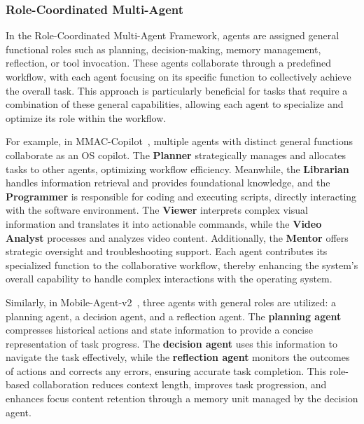 \subsubsection{Role-Coordinated Multi-Agent}
\label{subsubsec: Role-Coordinated Multi-Agent}

In the Role-Coordinated Multi-Agent Framework, agents are assigned general functional roles such as planning, decision-making, memory management, reflection, or tool invocation. These agents collaborate through a predefined workflow, with each agent focusing on its specific function to collectively achieve the overall task. This approach is particularly beneficial for tasks that require a combination of these general capabilities, allowing each agent to specialize and optimize its role within the workflow.

For example, in MMAC-Copilot~\cite{song2024mmac}, multiple agents with distinct general functions collaborate as an OS copilot. The \textbf{Planner} strategically manages and allocates tasks to other agents, optimizing workflow efficiency. Meanwhile, the \textbf{Librarian} handles information retrieval and provides foundational knowledge, and the \textbf{Programmer} is responsible for coding and executing scripts, directly interacting with the software environment. The \textbf{Viewer} interprets complex visual information and translates it into actionable commands, while the \textbf{Video Analyst} processes and analyzes video content. Additionally, the \textbf{Mentor} offers strategic oversight and troubleshooting support. Each agent contributes its specialized function to the collaborative workflow, thereby enhancing the system's overall capability to handle complex interactions with the operating system.

Similarly, in Mobile-Agent-v2~\cite{wang2024mobileagentv2}, three agents with general roles are utilized: a planning agent, a decision agent, and a reflection agent. The \textbf{planning agent} compresses historical actions and state information to provide a concise representation of task progress. The \textbf{decision agent} uses this information to navigate the task effectively, while the \textbf{reflection agent} monitors the outcomes of actions and corrects any errors, ensuring accurate task completion. This role-based collaboration reduces context length, improves task progression, and enhances focus content retention through a memory unit managed by the decision agent.


